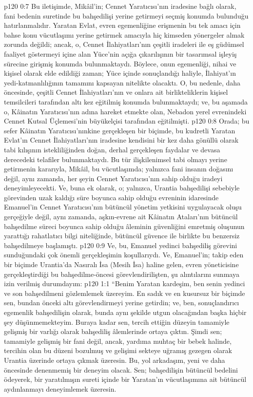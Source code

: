 \vs p120 0:7 Bu iletişimde, Mikâil’in; Cennet Yaratıcısı’nın iradesine bağlı olarak, fani bedenin suretinde bu bahşedilişi yerine getirmeyi seçmiş konumda bulunduğu hatırlanmalıdır. Yaratan Evlat, evren egemenliğine erişmenin bu tek amacı için bahse konu vücutlaşımı yerine getirmek amacıyla hiç kimseden yönergeler almak zorunda değildi; ancak, o, Cennet İlahiyatları’nın çeşitli iradeleri ile eş güdümsel faaliyet göstermeyi içine alan Yüce’nin açığa çıkarılışının bir tasarımsal işleyiş sürecine girişmiş konumda bulunmaktaydı. Böylece, onun egemenliği, nihai ve kişisel olarak elde edildiği zaman; Yüce içinde sonuçlandığı haliyle, İlahiyat’ın yedi\hyp{}katmanlılığının tamamını kapsayan nitelikte olacaktı. O, bu nedenle, daha öncesinde, çeşitli Cennet İlahiyatları’nın ve onlara ait birlikteliklerin kişisel temsilcileri tarafından altı kez eğitilmiş konumda bulunmaktaydı; ve, bu aşamada o, Kâinatın Yaratıcısı’nın adına hareket etmekte olan, Nebadon yerel evrenindeki Cennet Kutsal Üçlemesi’nin büyükelçisi tarafından eğitilmişti.
\vs p120 0:8 Orada; bu sefer Kâinatın Yaratıcısı’nınkine gerçekleşen bir biçimde, bu kudretli Yaratan Evlat’ın Cennet İlahiyatları’nın iradesine kendisini bir kez daha gönüllü olarak tabi kılışının istekliliğinden doğan, derhal gerçekleşen faydalar ve devasa derecedeki telafiler bulunmaktaydı. Bu tür ilişkilenimsel tabi olmayı yerine getirmenin kararıyla, Mikâil, bu vücutlaşımda; yalnızca fani insanın doğasını değil, aynı zamanda, her şeyin Cennet Yaratıcısı’nın sahip olduğu iradeyi deneyimleyecekti. Ve, buna ek olarak, o; yalnızca, Urantia bahşedilişi sebebiyle görevinden uzak kaldığı süre boyunca sahip olduğu evreninin idaresinde Emanuel’in Cennet Yaratıcısı’nın bütüncül yönetim yetkisini uygulayacak oluşu gerçeğiyle değil, aynı zamanda, aşkın\hyp{}evrene ait Kâinatın Ataları’nın bütüncül bahşedilme süreci boyunca sahip olduğu âleminin güvenliğini emretmiş oluşunun yarattığı rahatlatıcı bilgi niteliğinde, bütüncül güvence ile birlikte bu benzersiz bahşedilmeye başlamıştı.
\vs p120 0:9 Ve, bu, Emanuel yedinci bahşediliş görevini sunduğundaki çok önemli gerçekleşimin koşullarıydı. Ve, Emanuel’in; takip eden bir biçimde Urantia’da Nasıralı İsa (Mesih İsa) haline gelen, evren yöneticisine gerçekleştirdiği bu bahşedilme\hyp{}öncesi görevlendirilişten, şu alıntılarını sunmaya izin verilmiş durumdayım:
\vs p120 1:1 “Benim Yaratan kardeşim, ben senin yedinci ve son bahşedilmeni gözlemlemek üzereyim. En sadık ve en kusursuz bir biçimde sen, bundan önceki altı görevlendirmeyi yerine getirdin; ve, ben, sonuçlandırıcı egemenlik bahşedilişin olarak, bunda aynı şekilde utgun olacağından başka hiçbir şey düşünmemekteyim. Buraya kadar sen, tercih ettiğin düzeyin tamamiyle gelişmiş bir varlığı olarak bahşediliş âlemlerinde ortaya çıktın. Şimdi sen; tamamiyle gelişmiş bir fani değil, ancak, yardıma muhtaç bir bebek halinde, tercihin olan bu düzeni bozulmuş ve gelişimi sekteye uğramış gezegen olarak Urantia üzerinde ortaya çıkmak üzeresin. Bu, yol arkadaşım, yeni ve daha öncesinde denenmemiş bir deneyim olacak. Sen; bahşedilişin bütüncül bedelini ödeyerek, bir yaratılmışın sureti içinde bir Yaratan’ın vücutlaşımına ait bütüncül aydınlanmayı deneyimlemek üzeresin.
